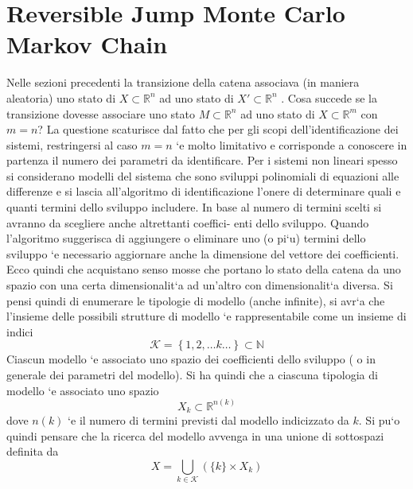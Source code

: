 \chapter{Reversible Jump Monte Carlo Markov Chain}
Nelle sezioni precedenti la transizione della catena associava (in maniera aleatoria)
uno stato di $X\subset \mathbb{R}^n$ ad uno stato di  $X'\subset \mathbb{R}^n$ .
Cosa succede se la transizione dovesse associare uno stato $M\subset \mathbb{R}^n$ ad uno stato
di $X\subset \mathbb{R}^m$ con $ m = n$?
La questione scaturisce dal fatto che per gli scopi dell’identificazione dei sistemi,
restringersi al caso $m = n$ `e molto limitativo e corrisponde a conoscere in partenza
il numero dei parametri da identificare.
Per i sistemi non lineari spesso si considerano modelli del sistema che sono sviluppi
polinomiali di equazioni alle differenze e si lascia all’algoritmo di identificazione
l’onere di determinare quali e quanti termini dello sviluppo includere.
In base al numero di termini scelti si avranno da scegliere anche altrettanti coeffici-
enti dello sviluppo.
Quando l’algoritmo suggerisca di aggiungere o eliminare uno (o pi`u) termini dello
sviluppo `e necessario aggiornare anche la dimensione del vettore dei coefficienti.
Ecco quindi che acquistano senso mosse che portano lo stato della catena da uno
spazio con una certa dimensionalit`a ad un’altro con dimensionalit`a diversa.
Si pensi quindi di enumerare le tipologie di modello (anche infinite), si avr`a che
l’insieme delle possibili strutture di modello `e rappresentabile come un insieme di
indici
\begin{equation*}
\mathcal{K}=\left\lbrace 1,2,\dots k \dots\right\rbrace \subset \mathbb{N}
\end{equation*}
Ciascun modello `e associato uno spazio dei coefficienti dello sviluppo ( o in generale
dei parametri del modello).
Si ha quindi che a ciascuna tipologia di modello `e associato uno spazio 
\begin{equation*}
X_k\subset\mathbb{R}^{n(k)}
\end{equation*} 
dove $n(k)$ `e il numero di termini previsti dal modello indicizzato da $k$.
Si pu`o quindi pensare che la ricerca del modello avvenga in una unione di sottospazi
definita da
\begin{equation}
X=\bigcup_{k\in \mathcal{K}}(\{k\}\times X_k)
\end{equation}

